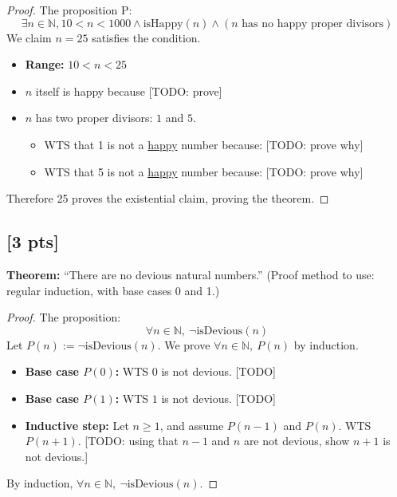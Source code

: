 \documentclass[11pt]{article}
\newcommand{\N}{\mathbb{N}}
\theoremstyle{definition}
\begin{document}
\begin{proof}
	The proposition $\text{P}$:
	\[
		\exists n \in \N, 10 < n < 1000 \wedge \text{isHappy}(n) \wedge (n \text{ has no happy proper divisors})
	\]
	We claim $n = 25$ satisfies the condition.

	\begin{itemize}
		\item \textbf{Range: } $10 < n < 25$ \checkmark
		\item $n$ itself is happy because [TODO: prove]
		\item $n$ has two proper divisors: $1$ and $5$.

		      \begin{itemize}
			      \item WTS that 1 is not a \underline{happy} number because: [TODO: prove why]
			      \item WTS that 5 is not a \underline{happy} number because: [TODO: prove why]
		      \end{itemize}
	\end{itemize}

	Therefore 25 proves the existential claim, proving the theorem.
\end{proof}

\vspace{1cm}

\subsection{[3 pts]} \textbf{Theorem:} “There are no devious natural numbers.” (Proof method to use: regular induction, with base cases 0 and 1.)
\begin{proof}
	The proposition:
	\[
		\forall n \in \N,\ \neg \text{isDevious}(n)
	\]
	Let $P(n) := \neg \text{isDevious}(n)$. We prove $\forall n \in \N,\ P(n)$ by induction.
	\begin{itemize}
		\item \textbf{Base case $P(0)$:} WTS $0$ is not devious. [TODO]
		\item \textbf{Base case $P(1)$:} WTS $1$ is not devious. [TODO]
		\item \textbf{Inductive step:} Let $n \geq 1$, and assume $P(n-1)$ and $P(n)$. WTS $P(n+1)$.
			      [TODO: using that $n-1$ and $n$ are not devious, show $n+1$ is not devious.]
	\end{itemize}
	By induction, $\forall n \in \N,\ \neg \text{isDevious}(n)$.
\end{proof}
\end{document}
